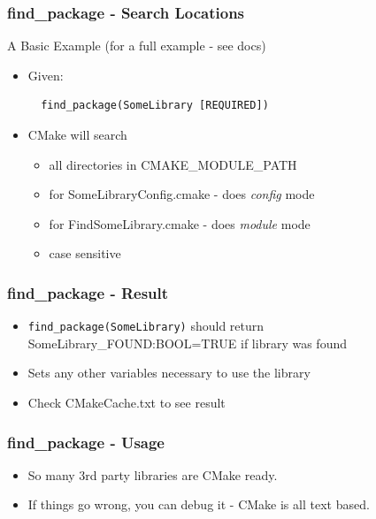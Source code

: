 \subsubsection{find\_package - Search
Locations}\label{findux5fpackage---search-locations}

A Basic Example (for a full example - see docs)

\begin{itemize}
\item
  Given:

\begin{verbatim}
  find_package(SomeLibrary [REQUIRED])
\end{verbatim}
\item
  CMake will search

  \begin{itemize}
  \itemsep1pt\parskip0pt
  \item
    all directories in CMAKE\_MODULE\_PATH
  \item
    for SomeLibraryConfig.cmake - does \emph{config} mode
  \item
    for FindSomeLibrary.cmake - does \emph{module} mode
  \item
    case sensitive
  \end{itemize}
\end{itemize}

\subsubsection{find\_package - Result}\label{findux5fpackage---result}

\begin{itemize}
\itemsep1pt\parskip0pt
\item
  \texttt{find\_package(SomeLibrary)} should return
  SomeLibrary\_FOUND:BOOL=TRUE if library was found
\item
  Sets any other variables necessary to use the library
\item
  Check CMakeCache.txt to see result
\end{itemize}

\subsubsection{find\_package - Usage}\label{findux5fpackage---usage}

\begin{itemize}
\itemsep1pt\parskip0pt
\item
  So many 3rd party libraries are CMake ready.
\item
  If things go wrong, you can debug it - CMake is all text based.
\end{itemize}

